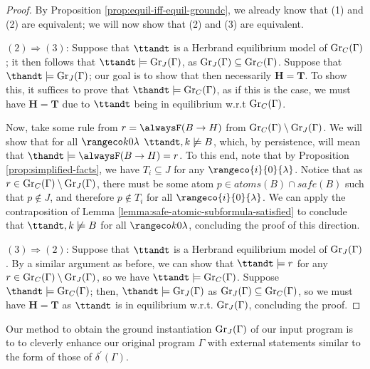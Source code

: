 \begin{proof}
  By Proposition \ref{prop:equil-iff-equil-groundc}, we already know that
  (1) and (2) are equivalent; we will now show that (2) and (3) are equivalent.

  $(2)\Rightarrow (3)$: Suppose that $\ttandt$ is a Herbrand equilibrium
  model of $\operatorname{Gr}_{C}(\Gamma)$; it then follows that
  $\ttandt \models \ground{J}{\Gamma}$, as
  $\operatorname{Gr}_{J}(\Gamma) \subseteq \operatorname{Gr}_{C}(\Gamma)$. Suppose that
  $\thandt \models \ground{J}{\Gamma}$; our goal is to show that then
  necessarily $\bm{H} = \bm{T}$. To show this, it suffices to prove
  that $\thandt \models \ground{C}{\Gamma}$, as if this is the case,
  we must have $\bm{H} = \bm{T}$ due to $\ttandt$ being in equilibrium
  w.r.t $\operatorname{Gr}_{C}(\Gamma)$.

  Now, take some rule from $r = \tempruleshort$ from
  $\operatorname{Gr}_{C}(\Gamma) \setminus \operatorname{Gr}_{J}(\Gamma)$.  We will show
  that for all $\kinlambda$ $\ttandt,k \not\models B$, which, by
  persistence, will mean that
  $\thandt \models \alwaysF( B \rightarrow H)=r$. To this end, note
  that by Proposition \ref{prop:simplified-facts}, we have
  $T_i \subseteq J$ for any $\rangeco{i}{0}{\lambda}$. Notice that as
  $r \in \operatorname{Gr}_{C}(\Gamma) \setminus \operatorname{Gr}_{J}(\Gamma)$, there must
  be some atom $p \in atoms(B) \cap safe(B)$ such that $p \not \in J$,
  and therefore $p \not \in T_i$ for all $\rangeco{i}{0}{\lambda}$. We can
  apply the contraposition of Lemma
  \ref{lemma:safe-atomic-subformula-satisfied} to conclude that
  $\ttandt,k \not \models B$ for all $\kinlambda$, concluding the
  proof of this direction.


  $(3)\Rightarrow (2)$: Suppose that $\ttandt$ is a Herbrand
  equilibrium model of $\operatorname{Gr}_{J}(\Gamma)$. By a similar argument as
  before, we can show that $\ttandt \models r$ for any
  $r \in \operatorname{Gr}_{C}(\Gamma) \setminus \operatorname{Gr}_{J}(\Gamma)$, so we have
  $\ttandt \models \ground{C}{\Gamma}$. Suppose
  $\thandt \models \ground{C}{\Gamma}$; then,
  $\thandt \models \ground{J}{\Gamma}$ as
  $\operatorname{Gr}_{J}(\Gamma) \subseteq \operatorname{Gr}_{C}(\Gamma)$, so we must have
  $\bm{H} = \bm{T}$ as $\ttandt$ is in equilibrium
  w.r.t. $\operatorname{Gr}_{J}(\Gamma)$, concluding the proof.
\end{proof}

Our method to obtain the ground instantiation $\operatorname{Gr}_{J}(\Gamma)$ of
our input program is to to cleverly enhance our original program
$\Gamma$ with external statements similar to the form of those of
$\delta^\prime(\Gamma)$.

